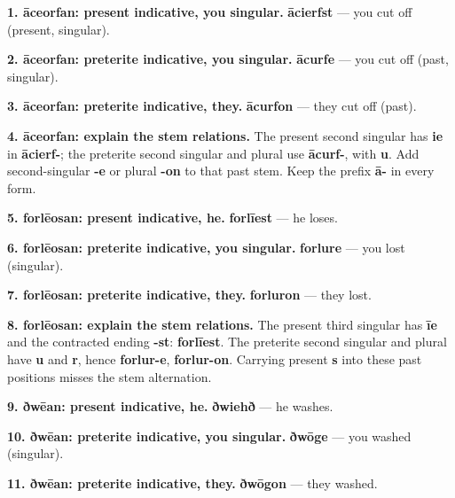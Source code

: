 \textbf{1. āceorfan: present indicative, you singular.} \textbf{ācierfst} — you cut off (present, singular).

\textbf{2. āceorfan: preterite indicative, you singular.} \textbf{ācurfe} — you cut off (past, singular).

\textbf{3. āceorfan: preterite indicative, they.} \textbf{ācurfon} — they cut off (past).

\textbf{4. āceorfan: explain the stem relations.} The present second singular has \textbf{ie} in \textbf{ācierf-}; the preterite second singular and plural use \textbf{ācurf-}, with \textbf{u}. Add second-singular \textbf{-e} or plural \textbf{-on} to that past stem. Keep the prefix \textbf{ā-} in every form.

\textbf{5. forlēosan: present indicative, he.} \textbf{forlīest} — he loses.

\textbf{6. forlēosan: preterite indicative, you singular.} \textbf{forlure} — you lost (singular).

\textbf{7. forlēosan: preterite indicative, they.} \textbf{forluron} — they lost.

\textbf{8. forlēosan: explain the stem relations.} The present third singular has \textbf{īe} and the contracted ending \textbf{-st}: \textbf{forlīest}. The preterite second singular and plural have \textbf{u} and \textbf{r}, hence \textbf{forlur-e}, \textbf{forlur-on}. Carrying present \textbf{s} into these past positions misses the stem alternation.

\textbf{9. ðwēan: present indicative, he.} \textbf{ðwiehð} — he washes.

\textbf{10. ðwēan: preterite indicative, you singular.} \textbf{ðwōge} — you washed (singular).

\textbf{11. ðwēan: preterite indicative, they.} \textbf{ðwōgon} — they washed.

